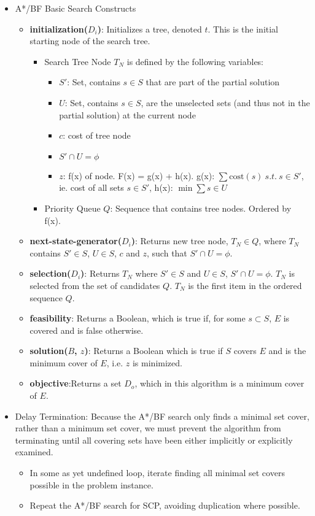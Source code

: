 \documentclass[12pt]{article}
\begin{document}
	\begin{itemize}
		\item A*/BF Basic Search Constructs
		\begin{itemize}
			\item \textbf{initialization($D_i$)}: Initializes a tree, denoted $t$. This is the initial starting node of the search tree.
			\begin{itemize}
				\item Search Tree Node $T_N$ is defined by the following variables:
				\begin{itemize}	
					\item $S\prime$: Set, contains $s \in S$ that are part of the partial solution
					\item $U$: Set, contains $s \in S$, are the unselected sets (and thus not in the partial solution) at the current node
					\item $c$: cost of tree node
					\item $S\prime \cap U = \phi$					\item $z$: f(x) of node. F(x) = g(x) + h(x). g(x): $\sum \text{cost}(s) \: s.t. \: s \in S\prime$, ie. cost of all sets $s \in S\prime$, h(x): $\min \sum s \in U$
				\end{itemize}
				\item Priority Queue $Q$: Sequence that contains tree nodes. Ordered by f(x).
			\end{itemize}	
			\item \textbf{next-state-generator($D_i$)}: Returns new tree node, $T_N \in Q$, where $T_N$ contains $S\prime \in S$, $U \in S$, $c$ and $z$, such that $S\prime \cap U = \phi$.
			\item \textbf{selection($D_i$)}: Returns $T_N$ where $S\prime \in S$ and $U \in S$, $S\prime \cap U = \phi$. $T_N$ is selected from the set of candidates $Q$. $T_N$ is the first item in the ordered sequence $Q$.
			\item \textbf{feasibility}: Returns a Boolean, which is true if, for some $s \subset S$, $E$ is covered and is false otherwise.
			\item \textbf{solution($B$, $z$)}: Returns a Boolean which is true if $S$ covers $E$ and is the minimum cover of $E$, i.e. $z$ is minimized.
			\item \textbf{objective}:Returns a set $D_o$, which in this algorithm is a minimum cover of $E$.
		\end{itemize}
		\item Delay Termination: Because the A*/BF search only finds a minimal set cover, rather than a minimum set cover, we must prevent the algorithm from terminating until all covering sets have been either implicitly or explicitly examined.
		\begin{itemize}
			\item In some as yet undefined loop, iterate finding all minimal set covers possible in the problem instance.
			\item Repeat the A*/BF search for SCP, avoiding duplication where possible.
		\end{itemize}
	\end{itemize}
	
\end{document}
